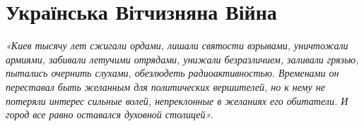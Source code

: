  
 
 
 
 
\chapter{Українська Вітчизняна Війна}

\begin{center}
\Large\em\color{blue}
«Киев тысячу лет сжигали ордами, лишали святости взрывами, уничтожали армиями,
забивали летучими отрядами, унижали безразличием, заливали грязью, пытались
очернить слухами, обезлюдеть радиоактивностью. Временами он переставал быть
желанным для политических вершителей, но к нему не потеряли интерес сильные
волей, непреклонные в желаниях его обитатели. И город все равно оставался
духовной столицей».
\end{center}














